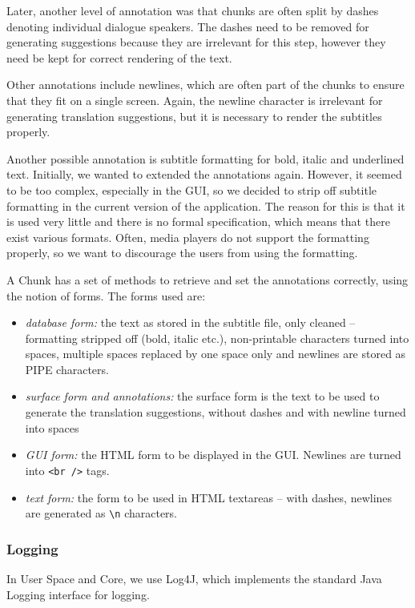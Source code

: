 Later, another level of annotation was that chunks are often split by dashes denoting individual dialogue speakers. The dashes need to be removed for generating suggestions because they are irrelevant for this step, however they need be kept for correct rendering of the text.

Other annotations include newlines, which are often part of the chunks to ensure that they fit on a single screen. Again, the newline character is irrelevant for generating translation suggestions, but it is necessary to render the subtitles properly.

Another possible annotation is subtitle formatting for bold, italic and underlined text. Initially, we wanted to extended the annotations again. However, it seemed to be too complex, especially in the GUI, so we decided to strip off subtitle formatting in the current version of the application. The reason for this is that it is used very little and there is no formal specification, which means that there exist various formats. Often, media players do not support the formatting properly, so we want to discourage the users from using the formatting.

A Chunk has a set of methods to retrieve and set the annotations correctly, using the notion of forms. The forms used are:

\begin{itemize}
	\item \emph{database form:} the text as stored in the subtitle file, only cleaned -- formatting stripped off (bold, italic etc.), non-printable characters turned into spaces, multiple spaces replaced by one space only and newlines are stored as PIPE characters.
	\item \emph{surface form and annotations:} the surface form is the text to be used to generate the translation suggestions, without dashes and with newline turned into spaces
	\item \emph{GUI form:} the HTML form to be displayed in the GUI. Newlines are turned into {\tt <br />} tags.
	\item \emph{text form:} the form to be used in HTML textareas -- with dashes, newlines are generated as {\tt \verb#\n#} characters.
\end{itemize}


\subsubsection{Logging}

In User Space and Core, we use Log4J, which implements the standard Java Logging interface for logging.

